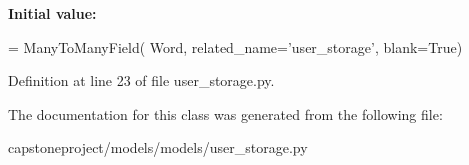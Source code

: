 {\bfseries Initial value\+:}
\begin{DoxyCode}
=  ManyToManyField(
        Word,
        related\_name=\textcolor{stringliteral}{'user\_storage'},
        blank=\textcolor{keyword}{True})
\end{DoxyCode}


Definition at line 23 of file user\+\_\+storage.\+py.



The documentation for this class was generated from the following file\+:\begin{DoxyCompactItemize}
\item 
capstoneproject/models/models/user\+\_\+storage.\+py\end{DoxyCompactItemize}
